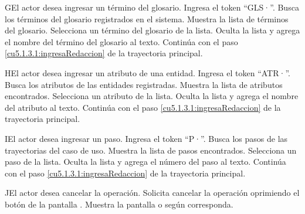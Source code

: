  \begin{UCtrayectoriaA}{G}{El actor desea ingresar un término del glosario.}
 	\UCpaso[\UCactor] Ingresa el token ``GLS·''.	
 	\UCpaso[\UCsist] Busca los términos del glosario registrados en el sistema. 
 	\UCpaso[\UCsist] Muestra la lista de términos del glosario.
 	\UCpaso[\UCactor] Selecciona un término del glosario de la lista.
  	\UCpaso[\UCsist] Oculta la lista y agrega el nombre del término del glosario al texto.
    \UCpaso[] Continúa con el paso \ref{cu5.1.3.1:ingresaRedaccion} de la trayectoria principal.
 \end{UCtrayectoriaA}

 \begin{UCtrayectoriaA}{H}{El actor desea ingresar un atributo de una entidad.}
 	\UCpaso[\UCactor] Ingresa el token ``ATR·''.
  	\UCpaso[\UCsist] Busca los atributos de las entidades registradas.
  	\UCpaso[\UCsist] Muestra la lista de atributos encontrados.
 	\UCpaso[\UCactor] Selecciona un atributo de la lista.
  	\UCpaso[\UCsist] Oculta la lista y agrega el nombre del atributo al texto.
    \UCpaso[] Continúa con el paso \ref{cu5.1.3.1:ingresaRedaccion} de la trayectoria principal.
 \end{UCtrayectoriaA}
 
 \begin{UCtrayectoriaA}{I}{El actor desea ingresar un paso.}
 	\UCpaso[\UCactor] Ingresa el token ``P·''.
  	\UCpaso[\UCsist] Busca los pasos de las trayectorias del caso de uso.
  	\UCpaso[\UCsist] Muestra la lista de pasos encontrados.
 	\UCpaso[\UCactor] Selecciona un paso de la lista.
  	\UCpaso[\UCsist] Oculta la lista y agrega el número del paso al texto.
    \UCpaso[] Continúa con el paso \ref{cu5.1.3.1:ingresaRedaccion} de la trayectoria principal.
 \end{UCtrayectoriaA}


 \begin{UCtrayectoriaA}{J}{El actor desea cancelar la operación.}
    \UCpaso[\UCactor] Solicita cancelar la operación oprimiendo el botón  de la pantalla .
    \UCpaso[\UCsist] Muestra la pantalla  o  según corresponda.
 \end{UCtrayectoriaA}
 
